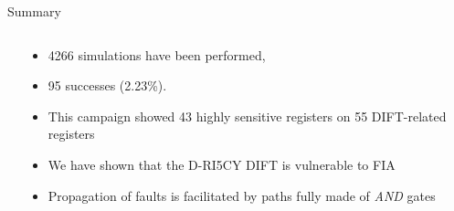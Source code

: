 \begin{frame}{Summary}
    \begin{columns}
        \begin{column}{.15\linewidth}
            \hfill
        \end{column}
        \begin{column}{.7\linewidth}
            \begin{itemize}
                [triangle]
                \item 4266 simulations have been performed,
                \item 95 successes (2.23\%).
                \item This campaign showed 43 highly sensitive registers on 55 DIFT-related registers
                \item We have shown that the D-RI5CY DIFT is vulnerable to FIA
                \item Propagation of faults is facilitated by paths fully made of \textit{AND} gates
            \end{itemize}
        \end{column}
        \begin{column}{.15\linewidth}
            \hfill
        \end{column}
    \end{columns}
\end{frame}
